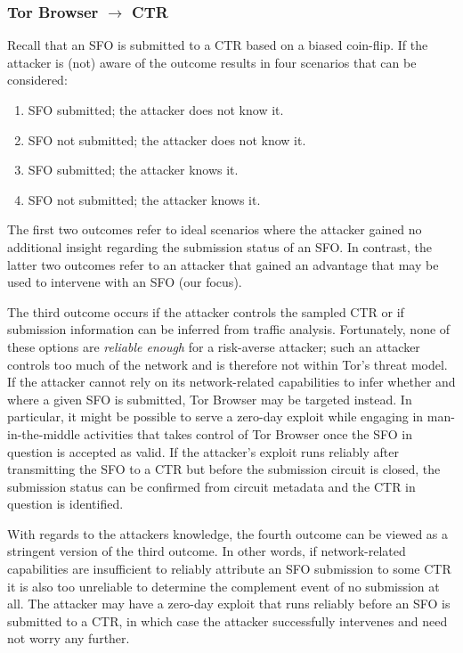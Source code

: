 \subsubsection{Tor Browser $\rightarrow$ CTR} \label{sec:security-analysis:tb}
Recall that an SFO is submitted to a CTR based on a biased coin-flip.  If
the attacker is (not) aware of the outcome results in four scenarios
that can be considered:
\begin{enumerate}
	\item SFO submitted; the attacker does not know it.
	\item SFO not submitted; the attacker does not know it.
	\item SFO submitted; the attacker knows it.
	\item SFO not submitted; the attacker knows it.
\end{enumerate}

The first two outcomes refer to ideal scenarios where the attacker gained no
additional insight regarding the submission status of an SFO.  In contrast,
the latter two outcomes refer to an attacker that gained an advantage that may
be used to intervene with an SFO (our focus).

The third outcome occurs if the attacker controls the sampled CTR or if
submission information can be inferred from traffic analysis.  Fortunately, none
of these options are \emph{reliable enough} for a risk-averse attacker;
	such an attacker controls too much of the network and is therefore not
	within Tor's threat model.
If the attacker cannot rely on its network-related capabilities to infer whether
and where a given SFO is submitted, Tor Browser may be targeted instead.  In
particular, it might be possible to serve a zero-day exploit while engaging in
man-in-the-middle activities that takes control of Tor Browser once the SFO in
question is accepted as valid.  If the attacker's exploit runs reliably after
transmitting the SFO to a CTR but before the submission circuit is closed,
the submission status can be confirmed from circuit metadata and the CTR in
question is identified.

With regards to the attackers knowledge, the fourth outcome can be viewed as a
stringent version of the third outcome.  In other words, if network-related
capabilities are insufficient to reliably attribute an SFO submission to some
CTR it is also too unreliable to determine the complement event of no submission
at all.  The attacker may have a zero-day exploit that runs reliably before
an SFO is submitted to a CTR, in which case the attacker successfully
intervenes and need not worry any further.

